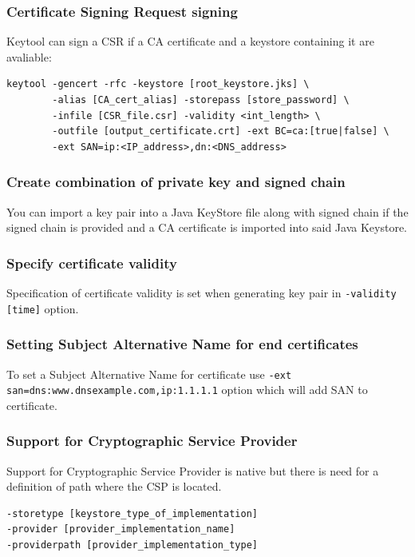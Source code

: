 \documentclass[10pt, a4paper]{report}
\begin{document}
    \subsubsection{Certificate Signing Request signing}
Keytool can sign a CSR if a CA certificate and a keystore containing it are avaliable:
\begin{verbatim}
keytool -gencert -rfc -keystore [root_keystore.jks] \
        -alias [CA_cert_alias] -storepass [store_password] \
        -infile [CSR_file.csr] -validity <int_length> \
        -outfile [output_certificate.crt] -ext BC=ca:[true|false] \
        -ext SAN=ip:<IP_address>,dn:<DNS_address> 
\end{verbatim}

    \subsubsection{Create combination of private key and signed chain}
You can import a key pair into a Java KeyStore file along with signed chain if the signed chain is provided and a CA certificate is imported into said Java Keystore.
    \subsubsection{Specify certificate validity}
Specification of certificate validity is set when generating key pair in \verb+-validity [time]+ option.

    \subsubsection{Setting Subject Alternative Name for end certificates}
To set a Subject Alternative Name for certificate use \verb+-ext san=dns:www.dnsexample.com,ip:1.1.1.1+ option which will add SAN to certificate.

    \subsubsection{Support for Cryptographic Service Provider}
Support for Cryptographic Service Provider is native but there is need for a definition of path where the CSP is located.
\begin{verbatim}
-storetype [keystore_type_of_implementation]
-provider [provider_implementation_name]
-providerpath [provider_implementation_type]
\end{verbatim}
    
\end{document}

